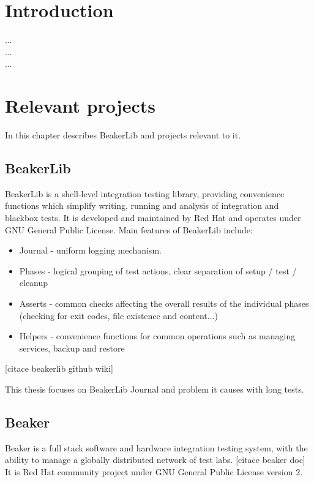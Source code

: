 
\chapter{Introduction}

...\\
...\\
...\\

\chapter{Relevant projects}

In this chapter describes BeakerLib and projects relevant to it.

\section{BeakerLib}

BeakerLib is a shell-level integration testing library, providing convenience functions which simplify writing, running and analysis of integration and blackbox tests. 
It is developed and maintained by Red Hat and operates under GNU General Public License.
Main features of BeakerLib include:
\begin{itemize}
\item Journal - uniform logging mechanism. 
\item Phases - logical grouping of test actions, clear separation of setup / test / cleanup
\item Asserts - common checks affecting the overall results of the individual phases (checking for exit codes, file existence and content...)
\item Helpers - convenience functions for common operations such as managing services, backup and restore 
\end{itemize}
[citace beakerlib github wiki]

This thesis focuses on BeakerLib Journal and problem it causes with long tests.


\section{Beaker}

Beaker is a full stack software and hardware integration testing system, with the ability to manage a globally distributed network of test labs.  [citace beaker doc] It is Red Hat community project under GNU General Public License version 2.


